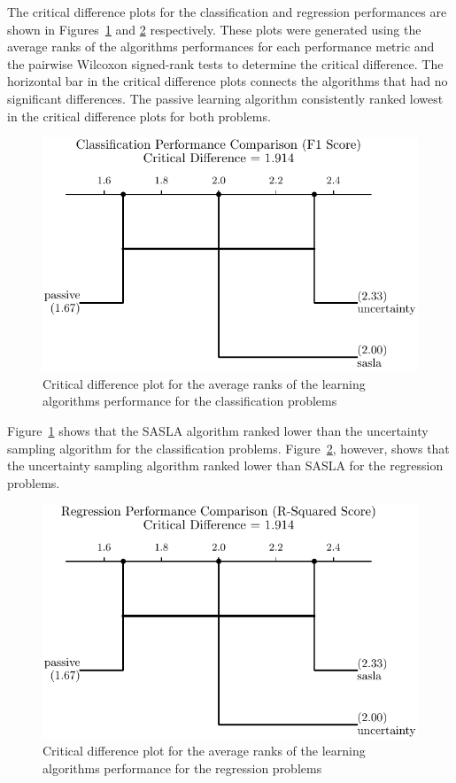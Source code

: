 \documentclass[conference]{IEEEtran}
\begin{document}
	The critical difference plots for the classification and regression performances are shown in Figures~\ref{fig:classification_cd} and \ref{fig:regression_cd} respectively. These plots were generated using the average ranks of the algorithms performances for each performance metric and the pairwise Wilcoxon signed-rank tests to determine the critical difference. The horizontal bar in the critical difference plots connects the algorithms that had no significant differences. The passive learning algorithm consistently ranked lowest in the critical difference plots for both problems. 
	
	\begin{figure}[htbp]
		\centering
		\includegraphics[width=\linewidth]{plots/classification_critical_difference.pdf}
		\caption{Critical difference plot for the average ranks of the learning algorithms performance for the classification problems}
		\label{fig:classification_cd}
	\end{figure}
	
	Figure~\ref{fig:classification_cd} shows that the SASLA algorithm ranked lower than the uncertainty sampling algorithm for the classification problems. Figure~\ref{fig:regression_cd}, however, shows that the uncertainty sampling algorithm ranked lower than SASLA for the regression problems. 
	
	\begin{figure}[htbp]
		\centering
		\includegraphics[width=\linewidth]{plots/regression_critical_difference.pdf}
		\caption{Critical difference plot for the average ranks of the learning algorithms performance for the regression problems}
		\label{fig:regression_cd}
	\end{figure}
	
\end{document}
